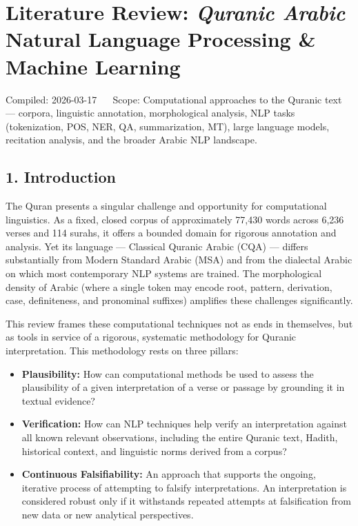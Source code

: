 \documentclass[12pt,a4paper]{article}
\providecommand{\tightlist}{\setlength{\itemsep}{0pt}\setlength{\parskip}{0pt}}
\begin{document}
\protect{}\label{top}
\section{\texorpdfstring{Literature Review: \emph{Quranic Arabic}\\
Natural Language Processing \& Machine
Learning}{Literature Review: Quranic Arabic Natural Language Processing \& Machine Learning}}\label{literature-review-quranic-arabic-natural-language-processing-machine-learning}

{Compiled:} 2026-03-17 ~\textbar~ {Scope:} Computational approaches to
the Quranic text --- corpora, linguistic annotation, morphological
analysis, NLP tasks (tokenization, POS, NER, QA, summarization, MT),
large language models, recitation analysis, and the broader Arabic NLP
landscape.

\protect{}\label{s1}
\subsection{1. Introduction}\label{introduction}

The Quran presents a singular challenge and opportunity for
computational linguistics. As a fixed, closed corpus of approximately
77,430 words across 6,236 verses and 114 surahs, it offers a bounded
domain for rigorous annotation and analysis. Yet its language ---
Classical Quranic Arabic (CQA) --- differs substantially from Modern
Standard Arabic (MSA) and from the dialectal Arabic on which most
contemporary NLP systems are trained. The morphological density of
Arabic (where a single token may encode root, pattern, derivation, case,
definiteness, and pronominal suffixes) amplifies these challenges
significantly.

This review frames these computational techniques not as ends in
themselves, but as tools in service of a rigorous, systematic
methodology for Quranic interpretation. This methodology rests on three
pillars:

\begin{itemize}
\tightlist
\item
  \textbf{Plausibility:} How can computational methods be used to assess
  the plausibility of a given interpretation of a verse or passage by
  grounding it in textual evidence?
\item
  \textbf{Verification:} How can NLP techniques help verify an
  interpretation against all known relevant observations, including the
  entire Quranic text, Hadith, historical context, and linguistic norms
  derived from a corpus?
\item
  \textbf{Continuous Falsifiability:} An approach that supports the
  ongoing, iterative process of attempting to falsify interpretations.
  An interpretation is considered robust only if it withstands repeated
  attempts at falsification from new data or new analytical
  perspectives.
\end{itemize}
\end{document}
